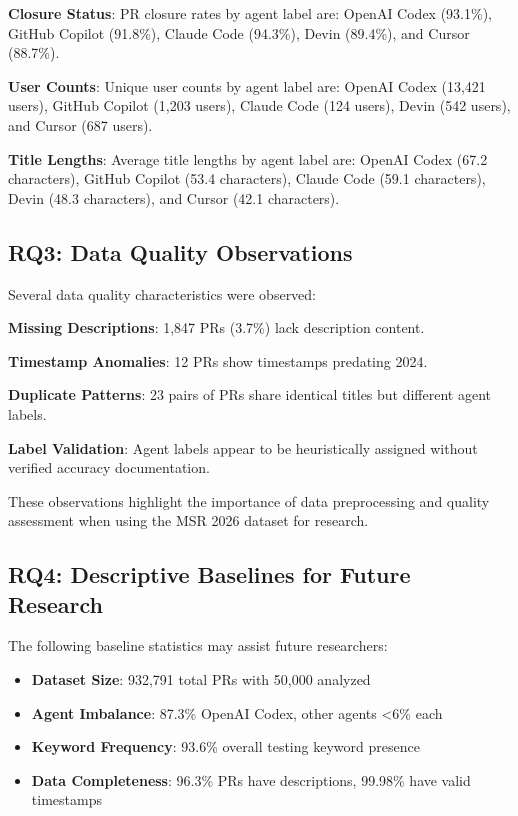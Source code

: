 \documentclass[conference]{IEEEtran}
\begin{document}
\textbf{Closure Status}: PR closure rates by agent label are: OpenAI Codex (93.1\%), GitHub Copilot (91.8\%), Claude Code (94.3\%), Devin (89.4\%), and Cursor (88.7\%).

\textbf{User Counts}: Unique user counts by agent label are: OpenAI Codex (13,421 users), GitHub Copilot (1,203 users), Claude Code (124 users), Devin (542 users), and Cursor (687 users).

\textbf{Title Lengths}: Average title lengths by agent label are: OpenAI Codex (67.2 characters), GitHub Copilot (53.4 characters), Claude Code (59.1 characters), Devin (48.3 characters), and Cursor (42.1 characters).

\subsection{RQ3: Data Quality Observations}

Several data quality characteristics were observed:

\textbf{Missing Descriptions}: 1,847 PRs (3.7\%) lack description content.

\textbf{Timestamp Anomalies}: 12 PRs show timestamps predating 2024.

\textbf{Duplicate Patterns}: 23 pairs of PRs share identical titles but different agent labels.

\textbf{Label Validation}: Agent labels appear to be heuristically assigned without verified accuracy documentation.

These observations highlight the importance of data preprocessing and quality assessment when using the MSR 2026 dataset for research.

\subsection{RQ4: Descriptive Baselines for Future Research}

The following baseline statistics may assist future researchers:

\begin{itemize}
    \item \textbf{Dataset Size}: 932,791 total PRs with 50,000 analyzed
    \item \textbf{Agent Imbalance}: 87.3\% OpenAI Codex, other agents <6\% each
    \item \textbf{Keyword Frequency}: 93.6\% overall testing keyword presence
    \item \textbf{Data Completeness}: 96.3\% PRs have descriptions, 99.98\% have valid timestamps
\end{itemize}
\end{document}
